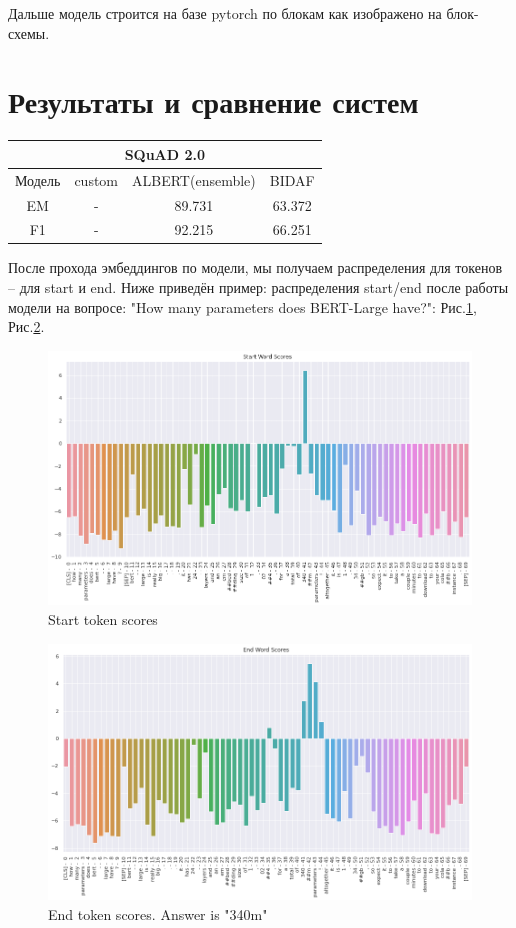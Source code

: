 \documentclass{article}
\begin{document}
Дальше модель строится на базе pytorch по блокам как изображено на блок-схемы.

\section{Результаты и сравнение систем}

\begin{table}[h]
    \centering
    \begin{tabular} {|c|c|c|c|}
        \hline
        \multicolumn{4}{|c|}{SQuAD 2.0} \\
        \hline
        Модель & custom & ALBERT(ensemble) & BIDAF\\
        \hline
        EM & - & 89.731 & 63.372\\
        \hline
        F1 & - & 92.215 & 66.251 \\ 
        \hline
    \end{tabular}
\end{table}

После прохода эмбеддингов по модели, мы получаем распределения для токенов -- для start и end. Ниже приведён пример: распределения start/end после работы модели на вопросе: "How many parameters does BERT-Large have?": Рис.\ref{fig:starttoken}, Рис.\ref{fig:endtoken}.

\begin{figure}[!ht]
    \centering
    \includegraphics[width=120mm]{../figures/start_token.png}
    \caption{Start token scores}
    \label{fig:starttoken}
\end{figure}

\begin{figure}[!ht]
    \centering
    \includegraphics[width=120mm]{../figures/end_token.png}
    \caption{End token scores. Answer is "340m"}
    \label{fig:endtoken}
\end{figure}
\end{document}
